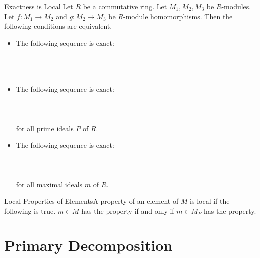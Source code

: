 \documentclass[a4paper]{article}
\begin{document}
\begin{prp}{Exactness is Local}{} Let $R$ be a commutative ring. Let $M_1,M_2,M_3$ be $R$-modules. Let $f:M_1\to M_2$ and $g:M_2\to M_3$ be $R$-module homomorphisms. Then the following conditions are equivalent. 
\begin{itemize}
\item The following sequence is exact: \\~\\
\\~\\
\item The following sequence is exact: \\~\\
\\~\\
for all prime ideals $P$ of $R$. 
\item The following sequence is exact: \\~\\
\\~\\
for all maximal ideals $m$ of $R$. 
\end{itemize}
\end{prp}

\begin{defn}{Local Properties of Elements}{}A property of an element of $M$ is local if the following is true. $m\in M$ has the property if and only if $m\in M_P$ has the property. 
\end{defn}

\pagebreak
\section{Primary Decomposition}
\end{document}
